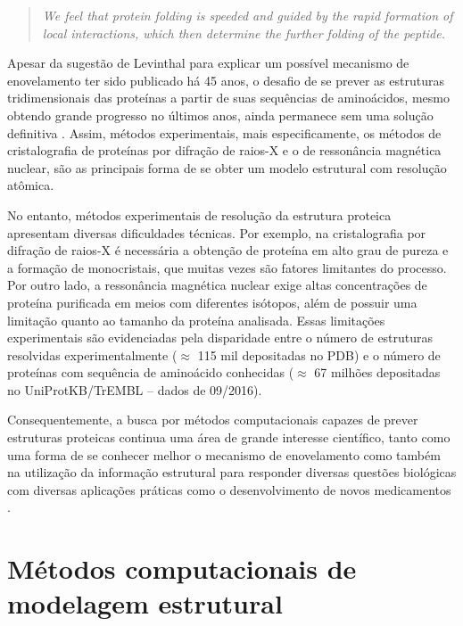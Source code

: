 \begin{quote}
\textit{We feel that protein folding is speeded and guided by the rapid formation of local interactions, which then determine the further folding of the peptide.}
\end{quote}

Apesar da sugestão de Levinthal para explicar um possível mecanismo de enovelamento ter sido publicado há 45 anos, o desafio de se prever as estruturas tridimensionais das proteínas a partir de suas sequências de aminoácidos, mesmo obtendo grande progresso no últimos anos, ainda permanece sem uma solução definitiva \cite{Moult2014}. Assim, métodos experimentais, mais especificamente, os métodos de cristalografia de proteínas por difração de raios-X e o de ressonância magnética nuclear, são as principais forma de se obter um modelo estrutural com resolução atômica. 

No entanto, métodos experimentais de resolução da estrutura proteica apresentam diversas dificuldades técnicas. Por exemplo, na cristalografia por difração de raios-X é necessária a obtenção de proteína em alto grau de pureza e a formação de monocristais, que muitas vezes são fatores limitantes do processo. Por outro lado, a ressonância magnética nuclear exige altas concentrações de proteína purificada em meios com diferentes isótopos, além de possuir uma limitação quanto ao tamanho da proteína analisada. Essas limitações experimentais são evidenciadas pela disparidade entre o número de estruturas resolvidas experimentalmente ($\approx$ 115 mil depositadas no PDB) e o número de proteínas com sequência de aminoácido conhecidas ($\approx$ 67 milhões depositadas no UniProtKB/TrEMBL – dados de 09/2016). 

Consequentemente, a busca por métodos computacionais capazes de prever estruturas proteicas continua uma área de grande interesse científico, tanto como uma forma de se conhecer melhor o mecanismo de enovelamento como também na utilização da informação estrutural para responder diversas questões biológicas com diversas aplicações práticas como o desenvolvimento de novos medicamentos \cite{Baker2001}.

\section{Métodos computacionais de modelagem estrutural}

